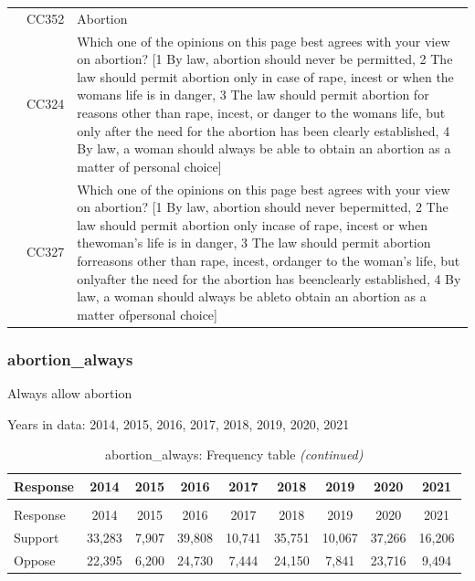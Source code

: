 \documentclass[
  12pt]{article}
\begin{document}
\begin{longtable}[t]{rl>{\raggedright\arraybackslash}p{10cm}}
\addlinespace
2011 & CC352 & Abortion\\
\addlinespace
2012 & CC324 & Which one of the opinions on this page best agrees with your view on abortion? [1 By law, abortion should never be permitted, 2 The law should permit abortion only in case of rape, incest or when the womans life is in danger, 3 The law should permit abortion for reasons other than rape, incest, or danger to the womans life, but only after the need for the abortion has been clearly established, 4 By law, a woman should always be able to obtain an abortion as a matter of personal choice]\\
\addlinespace
2013 & CC327 & Which one of the opinions on this page best agrees with your view on abortion? [1 By law, abortion should never bepermitted, 2 The law should permit abortion only incase of rape, incest or when thewoman's life is in danger, 3 The law should permit abortion forreasons other than rape, incest, ordanger to the woman's life, but onlyafter the need for the abortion has beenclearly established, 4 By law, a woman should always be ableto obtain an abortion as a matter ofpersonal choice]\\*
\end{longtable}
\endgroup{}

\hypertarget{abortion_always}{%
\subsubsection{abortion\_always}\label{abortion_always}}

Always allow abortion

Years in data: 2014, 2015, 2016, 2017, 2018, 2019, 2020,
2021\begingroup\fontsize{10}{12}\selectfont

\begin{longtable}[t]{lcccccccc}
\caption{\label{tab:unnamed-chunk-5}abortion\_always: Frequency table}\\
\toprule
Response & 2014 & 2015 & 2016 & 2017 & 2018 & 2019 & 2020 & 2021\\
\midrule
\endfirsthead
\caption[]{abortion\_always: Frequency table \textit{(continued)}}\\
\toprule
Response & 2014 & 2015 & 2016 & 2017 & 2018 & 2019 & 2020 & 2021\\
\midrule
\endhead

\endfoot
\bottomrule
\endlastfoot
Support & 33,283 & 7,907 & 39,808 & 10,741 & 35,751 & 10,067 & 37,266 & 16,206\\
Oppose & 22,395 & 6,200 & 24,730 & 7,444 & 24,150 & 7,841 & 23,716 & 9,494\\*
\end{longtable}
\endgroup{}
\end{document}
